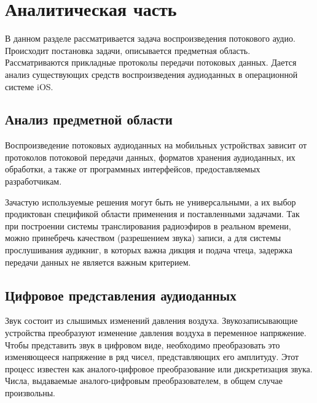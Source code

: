 \setupsectionbase
\section{Аналитическая часть}

	\par В данном разделе рассматривается задача воспроизведения потокового аудио.
	Происходит постановка задачи, описывается предметная область. 
	Рассматриваются прикладные протоколы передачи потоковых данных.
	Дается анализ существующих средств воспроизведения аудиоданных в операционной системе iOS.

\subsection{Анализ предметной области}
	\par Воспроизведение потоковых аудиоданных на мобильных устройствах зависит от 
	протоколов потоковой передачи данных, форматов хранения аудиоданных, их обработки,
	а также от программных интерфейсов, предоставляемых разработчикам. 
	
	Зачастую используемые решения могут быть не универсальными, 
	а их выбор продиктован спецификой области применения и поставленными задачами.
	Так при построении системы транслирования радиоэфиров в реальном времени, можно принебречь качеством (разрешением звука) записи,
	а для системы прослушивания аудикниг, в которых важна дикция и подача чтеца, задержка передачи данных не является важным критерием.

\subsection{Цифровое представления аудиоданных}

	\par Звук состоит из слышимых изменений давления воздуха. 
	Звукозаписывающие устройства преобразуют изменение давления воздуха в переменное напряжение. 
	Чтобы представить звук в цифровом виде, необходимо преобразовать это изменяющееся напряжение в ряд чисел, представляющих его амплитуду. 
	Этот процесс известен как аналого-цифровое преобразование или дискретизация звука. 
	Числа, выдаваемые аналого-цифровым преобразователем, в общем случае произвольны.

